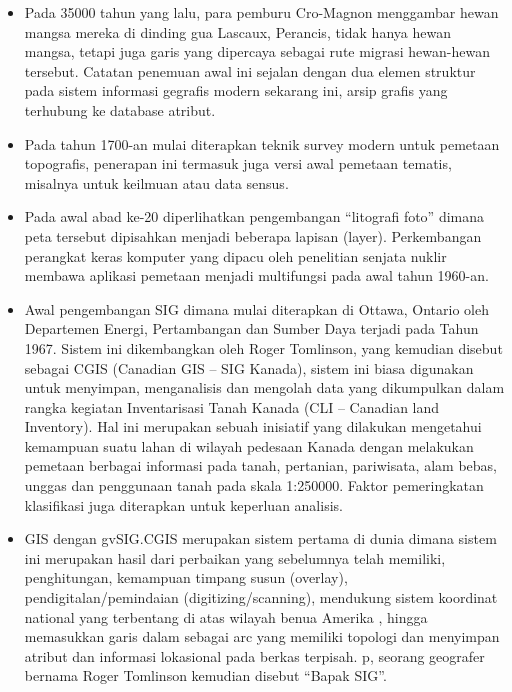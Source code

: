 \begin{itemize}
	\item Pada 35000 tahun yang lalu, para pemburu Cro-Magnon menggambar hewan mangsa mereka di dinding gua Lascaux, Perancis, tidak hanya hewan mangsa, tetapi juga garis yang dipercaya sebagai rute migrasi hewan-hewan tersebut. Catatan penemuan awal ini sejalan dengan dua elemen struktur pada sistem informasi gegrafis modern sekarang ini, arsip grafis yang terhubung ke database atribut.\hfill\break
	\item Pada tahun 1700-an mulai diterapkan teknik survey modern untuk pemetaan topografis, penerapan ini termasuk juga versi awal pemetaan tematis, misalnya untuk keilmuan atau data sensus.\hfill\break
	\item Pada awal abad ke-20 diperlihatkan pengembangan “litografi foto” dimana peta tersebut dipisahkan menjadi beberapa lapisan (layer). Perkembangan perangkat keras komputer yang dipacu oleh penelitian senjata nuklir membawa aplikasi pemetaan menjadi multifungsi pada awal tahun 1960-an.\hfill\break
	\item Awal pengembangan SIG dimana mulai diterapkan di Ottawa, Ontario oleh Departemen Energi, Pertambangan dan Sumber Daya terjadi pada Tahun 1967.  Sistem ini dikembangkan oleh Roger Tomlinson, yang kemudian disebut sebagai CGIS (Canadian GIS – SIG Kanada),  sistem ini biasa digunakan untuk menyimpan, menganalisis dan mengolah data yang dikumpulkan dalam rangka kegiatan Inventarisasi Tanah Kanada (CLI – Canadian land Inventory). Hal ini merupakan sebuah inisiatif yang dilakukan mengetahui kemampuan suatu lahan di wilayah pedesaan Kanada dengan melakukan pemetaan berbagai informasi pada tanah, pertanian, pariwisata, alam bebas, unggas dan penggunaan tanah pada skala 1:250000. Faktor pemeringkatan klasifikasi juga diterapkan untuk keperluan analisis.\hfill\break
	\item GIS dengan gvSIG.CGIS merupakan sistem pertama di dunia dimana sistem ini merupakan hasil dari perbaikan yang sebelumnya telah memiliki, penghitungan, kemampuan timpang susun (overlay), pendigitalan/pemindaian (digitizing/scanning), mendukung sistem koordinat national yang terbentang di atas wilayah benua Amerika ,  hingga memasukkan garis dalam sebagai arc yang memiliki topologi dan menyimpan atribut dan informasi lokasional pada berkas terpisah. p, seorang geografer bernama Roger Tomlinson kemudian disebut “Bapak SIG”.\hfill\break

\end{itemize}
